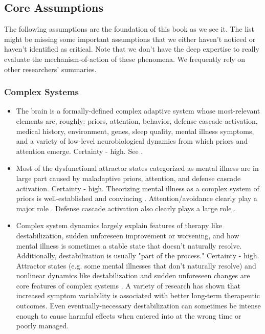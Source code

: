 \documentclass[12pt,letterpaper]{book}
\begin{document}
\subsection*{Core Assumptions}
The following assumptions are the foundation of this book as we see it. The list might be missing some important assumptions that we either haven't noticed or haven't identified as critical. Note that we don't have the deep expertise to really evaluate the mechanism-of-action of these phenomena. We frequently rely on other researchers' summaries.
\subsubsection*{Complex Systems}
\begin{itemize}
    \item The brain is a formally-defined complex adaptive system whose most-relevant elements are, roughly: priors, attention, behavior, defense cascade activation, medical history, environment, genes, sleep quality, mental illness symptoms, and a variety of low-level neurobiological dynamics from which priors and attention emerge. Certainty - high. See \textcite{friston2010free,clark2015surfing,berghSelfEvidencing,kozlowskaDefenseCascade}.
    \item Most of the dysfunctional attractor states categorized as mental illness are in large part caused by maladaptive priors, attention, and defense cascade activation. Certainty - high. Theorizing mental illness as a complex system of priors is well-established and convincing \cite{friston2010free,hayes2020complex}. Attention/avoidance clearly play a major role \cite{berghSelfEvidencing}. Defense cascade activation also clearly plays a large role \cite{kozlowskaDefenseCascade}.
	\item Complex system dynamics largely explain features of therapy like destabilization, sudden unforeseen improvement or worsening, and how mental illness is sometimes a stable state that doesn't naturally resolve. Additionally, destabilization is usually "part of the process." Certainty - high. Attractor states (e.g. some mental illnesses that don't naturally resolve) and nonlinear dynamics like destabilization and sudden unforeseen changes are core features of complex systems \cite{olthofDestabilization}. A variety of research has shown that increased symptom variability is associated with better long-term therapeutic outcomes. Even eventually-necessary destabilization can sometimes be intense enough to cause harmful effects when entered into at the wrong time or poorly managed.

\end{itemize}
\end{document}
